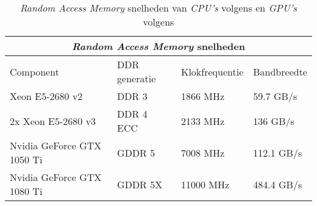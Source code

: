 \begin{table}[b]
    \begin{tabular}{ |p{5.3cm}|p{2.9cm}|p{3.0cm}|p{2.7cm}|  }
        \hline
        \multicolumn{4}{|c|}{\textit{Random Access Memory} snelheden} \\
        \hline
        Component& DDR generatie & Klokfrequentie & Bandbreedte \\
        \hline
            Xeon E5-2680 v2             & DDR 3     & 1866 MHz  & 59.7 GB/s \\
            2x Xeon E5-2680 v3          & DDR 4 ECC & 2133 MHz  & 136 GB/s  \\
            Nvidia GeForce GTX 1050 Ti  & GDDR 5    & 7008 MHz  & 112.1 GB/s\\
            Nvidia GeForce GTX 1080 Ti  & GDDR 5X   & 11000 MHz & 484.4 GB/s\\
        \hline
    \end{tabular}
    \caption[RAM snelheden voor \textit{CPU's} en \textit{GPU's}~\autocite{Intel2013,Intel2014,TechPowerUp2016, TechPowerUp2017}]{\textit{Random Access Memory} snelheden van \textit{CPU's} volgens \textcite{Intel2013,Intel2014} en \textit{GPU's} volgens \textcite{TechPowerUp2016, TechPowerUp2017}}
    \label{tab:RAMSpeeds}
\end{table}
